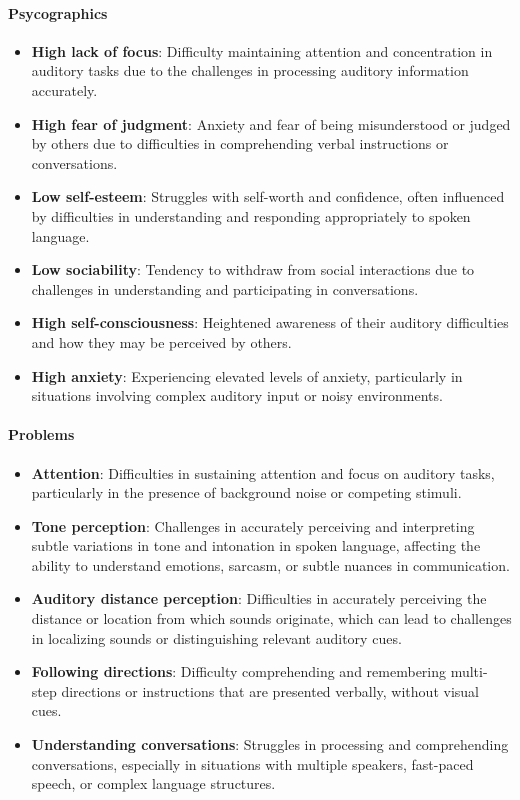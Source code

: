 \paragraph{Psycographics}
\begin{itemize}
    \item \textbf{High lack of focus}: Difficulty maintaining attention and concentration in auditory tasks due to the challenges in processing auditory information accurately.
    \item \textbf{High fear of judgment}: Anxiety and fear of being misunderstood or judged by others due to difficulties in comprehending verbal instructions or conversations.
    \item \textbf{Low self-esteem}: Struggles with self-worth and confidence, often influenced by difficulties in understanding and responding appropriately to spoken language.
    \item \textbf{Low sociability}: Tendency to withdraw from social interactions due to challenges in understanding and participating in conversations.
    \item \textbf{High self-consciousness}: Heightened awareness of their auditory difficulties and how they may be perceived by others.
    \item \textbf{High anxiety}: Experiencing elevated levels of anxiety, particularly in situations involving complex auditory input or noisy environments.
\end{itemize}

\paragraph{Problems}
\begin{itemize}
    \item \textbf{Attention}: Difficulties in sustaining attention and focus on auditory tasks, particularly in the presence of background noise or competing stimuli.
    \item \textbf{Tone perception}: Challenges in accurately perceiving and interpreting subtle variations in tone and intonation in spoken language, affecting the ability to understand emotions, sarcasm, or subtle nuances in communication.
    \item \textbf{Auditory distance perception}: Difficulties in accurately perceiving the distance or location from which sounds originate, which can lead to challenges in localizing sounds or distinguishing relevant auditory cues.
    \item \textbf{Following directions}: Difficulty comprehending and remembering multi-step directions or instructions that are presented verbally, without visual cues.
    \item \textbf{Understanding conversations}: Struggles in processing and comprehending conversations, especially in situations with multiple speakers, fast-paced speech, or complex language structures.
\end{itemize}

